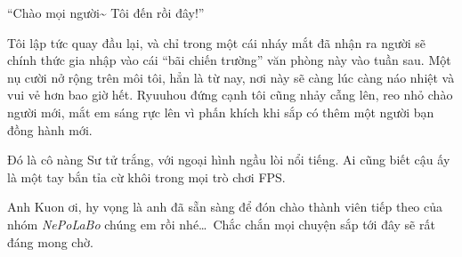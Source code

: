 \documentclass[../main.tex]{subfiles}
\begin{document}
``Chào mọi người\~{} Tôi đến rồi đây!''

Tôi lập tức quay đầu lại, và chỉ trong một cái nháy mắt đã nhận ra người sẽ chính thức gia nhập vào cái ``bãi chiến trường'' văn phòng này vào tuần sau. Một nụ cười nở rộng trên môi tôi, hẳn là từ nay, nơi này sẽ càng lúc càng náo nhiệt và vui vẻ hơn bao giờ hết. Ryuuhou đứng cạnh tôi cũng nhảy cẫng lên, reo nhỏ chào người mới, mắt em sáng rực lên vì phấn khích khi sắp có thêm một người bạn đồng hành mới.

Đó là cô nàng Sư tử trắng, với ngoại hình ngầu lòi nổi tiếng. Ai cũng biết cậu ấy là một tay bắn tỉa cừ khôi trong mọi trò chơi FPS.

Anh Kuon ơi, hy vọng là anh đã sẵn sàng để đón chào thành viên tiếp theo của nhóm \textit{NePoLaBo} chúng em rồi nhé\dots\ Chắc chắn mọi chuyện sắp tới đây sẽ rất đáng mong chờ.
\end{document}
